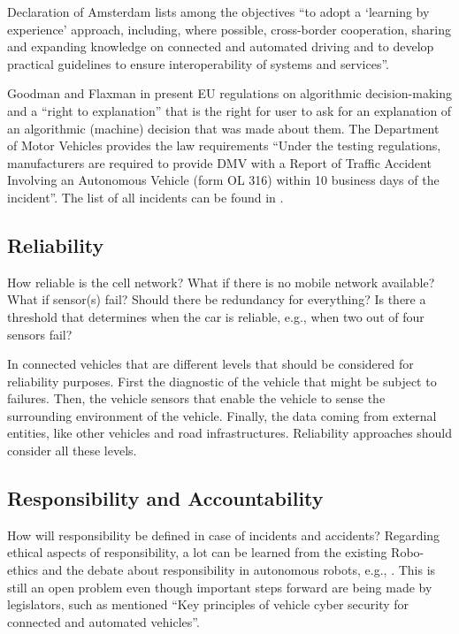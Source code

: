 Declaration of Amsterdam \cite{GovernmentNL2017} lists among the objectives \enquote{to adopt a \enquote{learning by experience} approach, including, where possible, cross-border cooperation, sharing and expanding knowledge on connected and automated driving and to develop practical guidelines to ensure interoperability of systems and services}.

Goodman and Flaxman in \cite{2016arXiv160608813G_GoodmanFlaxman} present EU regulations on algorithmic decision-making and a \enquote{right to explanation} that is the right for user to ask for an explanation of an algorithmic (machine) decision that was made about them.
The Department of Motor Vehicles provides the law requirements \cite{DepartmentofMotorVehiclesStateofCalifornia} \enquote{Under the testing regulations, manufacturers are required to provide DMV with a Report of Traffic Accident Involving an Autonomous Vehicle (form OL 316) within 10 business days of the incident}. The list of all incidents can be found in \cite{DepartmentofMotorVehiclesStateofCalifornia_OL316Reports}.


\subsection{Reliability}
\label{sec:EAofTC:Reliability}

How reliable is the cell network? What if there is no mobile network available? What if sensor(s) fail? Should there be redundancy for everything? Is there a threshold that determines when the car is reliable, e.g., when two out of four sensors fail?  

In connected vehicles that are different levels that should be considered for reliability purposes. First the diagnostic of the vehicle that might be subject to failures. Then, the vehicle sensors that enable the vehicle to sense the surrounding environment of the vehicle. Finally, the data coming from external entities, like other vehicles and road infrastructures. Reliability approaches should consider all these levels.


\subsection{Responsibility and Accountability}
\label{sec:EAofTC:ResponsibilityAndAccountability}

How will responsibility be defined in case of incidents and accidents? Regarding ethical aspects of responsibility, a lot can be learned from the existing Robo-ethics and the debate about responsibility in autonomous robots, e.g., \cite{Dodig-Crnkovic:2008:SMR:1566864.1566888}. This is still an open problem even though important steps forward are being made by legislators, such as mentioned \enquote{Key principles of vehicle cyber security for connected and automated vehicles}.


